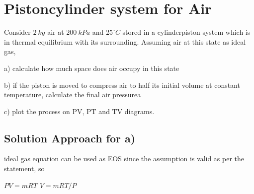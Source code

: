 \documentclass[letterpaper,10pt,english]{jupyterBook}
\begin{document}
\section{Piston\sphinxhyphen{}cylinder system for Air}
\label{\detokenize{notebooks/Chapter3/CH3-Q3_edited_edited:piston-cylinder-system-for-air}}\label{\detokenize{notebooks/Chapter3/CH3-Q3_edited_edited::doc}}
\sphinxAtStartPar
Consider \(2\:kg\) air at \(200\:kPa\) and \(25 ^{\circ}  C\) stored in a cylinder\sphinxhyphen{}piston system which is in thermal equilibrium with its surrounding. Assuming air at this state as ideal gas,

\sphinxAtStartPar
a) calculate how much space does air occupy in this state

\sphinxAtStartPar
b) if the piston is moved to compress air to half its initial volume at constant temperature, calculate the final air pressurea

\sphinxAtStartPar
c) plot the process on P\sphinxhyphen{}V, P\sphinxhyphen{}T and T\sphinxhyphen{}V diagrams.


\subsection{Solution Approach for a)}
\label{\detokenize{notebooks/Chapter3/CH3-Q3_edited_edited:solution-approach-for-a}}
\sphinxAtStartPar
ideal gas equation can be used as EOS since the assumption is valid as per the statement, so

\sphinxAtStartPar
\(PV=mRT\) 
\(V=mRT/P\)
\end{document}
